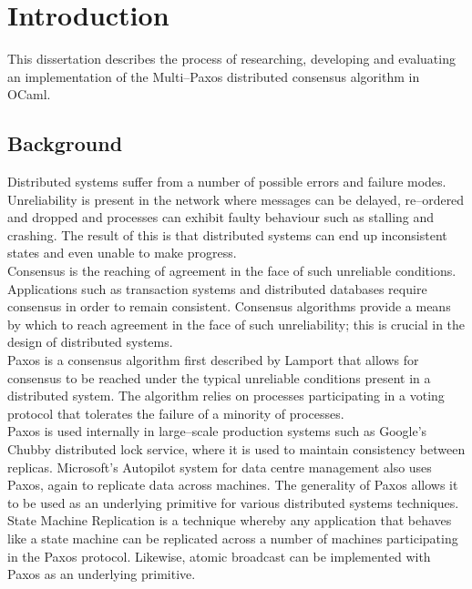 \chapter{Introduction}

This dissertation describes the process of researching, developing and evaluating an implementation of the Multi--Paxos distributed consensus algorithm in OCaml.

\section{Background}

Distributed systems suffer from a number of possible errors and failure modes. Unreliability is present in the network where messages can be delayed, re--ordered and dropped and processes can exhibit faulty behaviour such as stalling and crashing. The result of this is that distributed systems can end up inconsistent states and even unable to make progress. \\

Consensus is the reaching of agreement in the face of such unreliable conditions. Applications such as transaction systems and distributed databases require consensus in order to remain consistent. Consensus algorithms provide a means by which to reach agreement in the face of such unreliability; this is crucial in the design of distributed systems. \\

Paxos is a consensus algorithm first described by Lamport \cite{Lamport:1998:PP:279227.279229} that allows for consensus to be reached under the typical unreliable conditions present in a distributed system. The algorithm relies on processes participating in a voting protocol that tolerates the failure of a minority of processes. \\

Paxos is used internally in large--scale production systems such as Google's Chubby \cite{Burrows:2006:CLS:1298455.1298487} distributed lock service, where it is used to maintain consistency between replicas. Microsoft's Autopilot \cite{autopilot-automatic-data-center-management} system for data centre management also uses Paxos, again to replicate data across machines. The generality of Paxos allows it to be used as an underlying primitive for various distributed systems techniques. State Machine Replication \cite{Schneider:1990:IFS:98163.98167} is a technique whereby any application that behaves like a state machine can be replicated across a number of machines participating in the Paxos protocol. Likewise, atomic broadcast \cite{Rodrigues:2003:ABA:942591.942742} can be implemented with Paxos as an underlying primitive. \\

